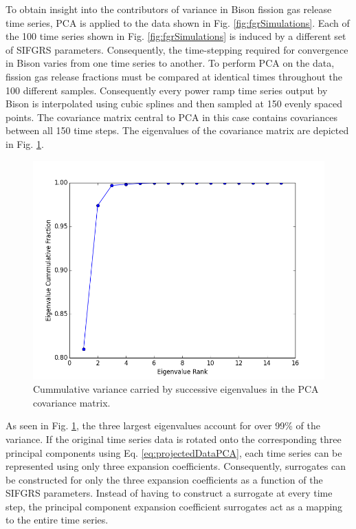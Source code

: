 To obtain insight into the contributors of variance in Bison fission gas release time series, \ac{PCA} is applied to the data shown in Fig. \ref{fig:fgrSimulations}. Each of the 100 time series shown in Fig. \ref{fig:fgrSimulations} is induced by a different set of \ac{SIFGRS} parameters. Consequently, the time-stepping required for convergence in Bison varies from one time series to another. To perform \ac{PCA} on the data, fission gas release fractions must be compared at identical times throughout the 100 different samples. Consequently every power ramp time series output by Bison is interpolated using cubic splines and then sampled at 150 evenly spaced points. The covariance matrix central to \ac{PCA} in this case contains covariances between all 150 time steps. The eigenvalues of the covariance matrix are depicted in Fig. \ref{fig:fgrEvals}.
\begin{figure}
\caption{\label{fig:fgrEvals}
Cummulative variance carried by successive eigenvalues in the \ac{PCA} covariance matrix.}
 \begin{center}
  \includegraphics[scale=.75]{./Chapter4/fgr_evals.png}
 \end{center}
\end{figure}
As seen in Fig. \ref{fig:fgrEvals}, the three largest eigenvalues account for over 99\% of the variance. If the original time series data is rotated onto the corresponding three principal components using Eq. \ref{eq:projectedDataPCA}, each time series can be represented using only three expansion coefficients. Consequently, surrogates can be constructed for only the three expansion coefficients as a function of the \ac{SIFGRS} parameters. Instead of having to construct a surrogate at every time step, the principal component expansion coefficient surrogates act as a mapping to the entire time series.   

